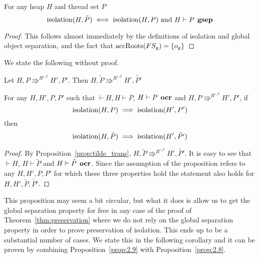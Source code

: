 \begin{proposition} \label{prop:2.8}
  For any heap $H$ and thread set $P$
  \begin{equation*}
    \mbox{$\mathrm{isolation}$}{(H, \tilde{P})} \iff \mbox{$\mathrm{isolation}$}{(H, P)} \text{ and } H \vdash P
    \:\: \mbox{\bf gsep} 
  \end{equation*}
\end{proposition}

\begin{proof}
  This follows almost immediately by the definitions of isolation and global
  object separation, and the fact that $\mbox{$\mathrm{accRoots}$}(FS_g) = \left\{
    o_g \right\}$ 
\end{proof}

We state the following without proof.
\begin{proposition} \label{prop:tilde_trans}
  Let $H, P \Rrightarrow^{R^{\iota, \beta}} H', P'$. Then $H, \tilde{P}
  \Rrightarrow^{R^{\iota, \beta}} H', \tilde{P'}$
\end{proposition}

\begin{proposition} \label{prop:2.9}
  For any $H, H', P, P'$ such that $\vdash H, H \vdash P$, $H \vdash P \:\:
  \mbox{\bf ocr}$ and $H, P \Rrightarrow^{R^{\iota, \beta}} H', P'$, if
  \begin{equation*}
      \mbox{$\mathrm{isolation}$}(H, P) 
      \implies 
      \mbox{$\mathrm{isolation}$}(H', P')
  \end{equation*}
  then
  \begin{equation*}
    \mbox{$\mathrm{isolation}$}(H, \tilde{P}) \implies \mbox{$\mathrm{isolation}$}(H', \tilde{P'})
  \end{equation*}
\end{proposition}

\begin{proof}
  By Proposition~\ref{prop:tilde_trans}, $H, \tilde{P} \Rrightarrow^{R^{\iota,
  \beta}} H', \tilde{P'}$. It is easy to see that $\vdash H$, $H \vdash
  \tilde{P}$ and $H \vdash \tilde{P} \:\: \mbox{\bf ocr}$.
  Since the assumption of the proposition refers to any $H, H', P, P'$ for which
  these three properties hold the statement also holds for $H, H',
  \tilde{P}, \tilde{P'}$.
\end{proof}

\begin{remark}
  This proposition may seem a bit circular, but what it does is allow us to get
  the global separation property for free in any case of the proof of
  Theorem~\ref{thm:preservation} where we do not rely on the global separation
  property in order to prove preservation of isolation. This ends up to be a
  substantial number of cases. We state this in the following corollary and it
  can be proven by combining Proposition~\ref{prop:2.9} with
  Proposition~\ref{prop:2.8}. 
\end{remark}

